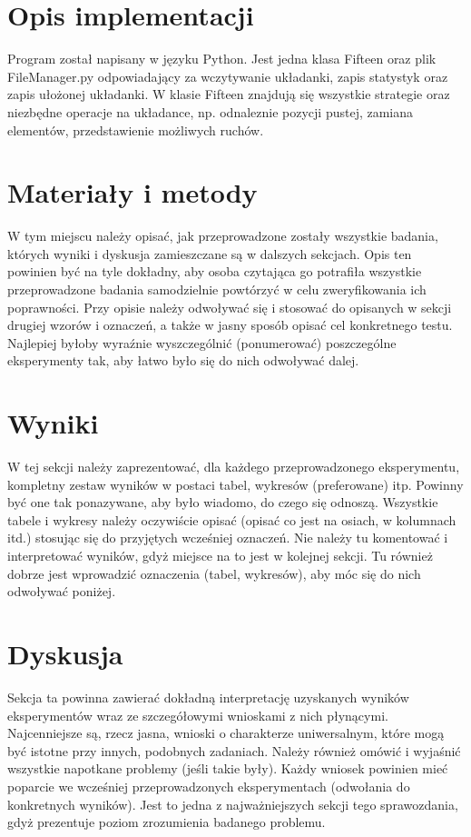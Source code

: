 \documentclass{classrep}
\begin{document}
\section{Opis implementacji}
{
Program został napisany w języku Python. Jest jedna klasa Fifteen oraz plik FileManager.py odpowiadający za wczytywanie układanki, zapis statystyk oraz zapis ułożonej układanki. W klasie Fifteen znajdują się wszystkie strategie oraz niezbędne operacje na układance, np. odnaleznie pozycji pustej, zamiana elementów, przedstawienie możliwych ruchów.}

\section{Materiały i metody}
{
W tym miejscu należy opisać, jak przeprowadzone zostały wszystkie badania,
których wyniki i dyskusja zamieszczane są w dalszych sekcjach. Opis ten
powinien być na tyle dokładny, aby osoba czytająca go potrafiła wszystkie
przeprowadzone badania samodzielnie powtórzyć w celu zweryfikowania ich
poprawności. Przy opisie należy odwoływać się i stosować do
opisanych w sekcji drugiej wzorów i oznaczeń, a także w jasny sposób opisać
cel konkretnego testu. Najlepiej byłoby wyraźnie wyszczególnić (ponumerować)
poszczególne eksperymenty tak, aby łatwo było się do nich odwoływać dalej.}

\section{Wyniki}
{
W tej sekcji należy zaprezentować, dla każdego przeprowadzonego eksperymentu,
kompletny zestaw wyników w postaci tabel, wykresów (preferowane) itp. Powinny
być one tak ponazywane, aby było wiadomo, do czego się odnoszą. Wszystkie
tabele i wykresy należy oczywiście opisać (opisać co jest na osiach, w
kolumnach itd.) stosując się do przyjętych wcześniej oznaczeń. Nie należy tu
komentować i interpretować wyników, gdyż miejsce na to jest w kolejnej sekcji.
Tu również dobrze jest wprowadzić oznaczenia (tabel, wykresów), aby móc się do
nich odwoływać poniżej.}

\section{Dyskusja}
{
Sekcja ta powinna zawierać dokładną interpretację uzyskanych wyników
eksperymentów wraz ze szczegółowymi wnioskami z nich płynącymi. Najcenniejsze
są, rzecz jasna, wnioski o charakterze uniwersalnym, które mogą być istotne
przy innych, podobnych zadaniach. Należy również omówić i wyjaśnić wszystkie
napotkane problemy (jeśli takie były). Każdy wniosek powinien mieć poparcie we
wcześniej przeprowadzonych eksperymentach (odwołania do konkretnych wyników).
Jest to jedna z najważniejszych sekcji tego sprawozdania, gdyż prezentuje
poziom zrozumienia badanego problemu.}
\end{document}
